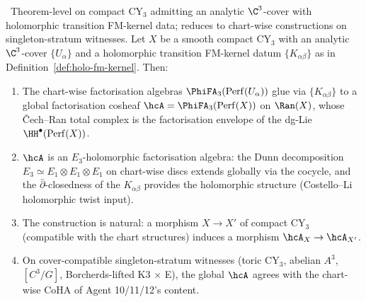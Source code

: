 \begin{theorem}
\label{thm:phi-fa-3-gluing}
\textup{\ClaimStatusConjectured\ Theorem-level on compact CY$_3$
admitting an analytic $\C^3$-cover with holomorphic transition
FM-kernel data; reduces to chart-wise constructions on
singleton-stratum witnesses.} Let $X$ be a smooth compact CY$_3$
with an analytic $\C^3$-cover $\{U_\alpha\}$ and a holomorphic
transition FM-kernel datum $\{K_{\alpha\beta}\}$ as in
Definition~\ref{def:holo-fm-kernel}. Then:
\begin{enumerate}[leftmargin=2em]
\item The chart-wise factorisation algebras
$\PhiFA_3(\mathrm{Perf}(U_\alpha))$ glue via $\{K_{\alpha\beta}\}$
to a global factorisation cosheaf $\hcA = \PhiFA_3(\mathrm{Perf}(X))$
on $\Ran(X)$, whose Čech--Ran total complex is the factorisation
envelope of the dg-Lie $\HH^\bullet(\mathrm{Perf}(X))$.
\item $\hcA$ is an $E_3$-holomorphic factorisation algebra: the
Dunn decomposition $E_3 \simeq E_1 \otimes E_1 \otimes E_1$ on
chart-wise discs extends globally via the cocycle, and the
$\bar\partial$-closedness of the $K_{\alpha\beta}$ provides the
holomorphic structure (Costello--Li holomorphic twist input).
\item The construction is natural: a morphism $X \to X'$ of
compact CY$_3$ (compatible with the chart structures) induces a
morphism $\hcA_X \to \hcA_{X'}$.
\item On cover-compatible singleton-stratum witnesses (toric CY$_3$,
abelian $A^3$, $[C^3/G]$, Borcherds-lifted K3 $\times$ E), the global
$\hcA$ agrees with the chart-wise CoHA of Agent 10/11/12's content.
\end{enumerate}
\end{theorem}

